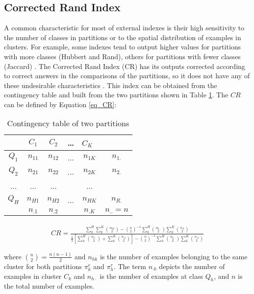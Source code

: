 \subsection{Corrected Rand Index}

A common characteristic for most of external indexes is their high sensitivity to the number of classes in partitions or to the spatial distribution of examples in clusters. For example, some indexes tend to output higher values for partitions with more classes (Hubbert and Rand), others for partitions with fewer classes (Jaccard) \cite{Dubes1987}. The Corrected Rand Index (CR) has its outputs corrected according to correct answers in the comparisons of the partitions, so it does not have any of these undesirable characteristics \cite{Milligan1986}. This index can be obtained from the contingency table and built from the two partitions shown in Table \ref{tab_contigencia}. The $CR$ can be defined by Equation \ref{eq_CR}:

\begin{table}[h]
\begin{center}
\caption{Contingency table of two partitions}
\label{tab_contigencia}
\begin{tabular}{|c|c|c|c|c|c|}
\hline &  $C_1$ & $C_2$ & \ldots & $C_K$\ & \\
\hline $Q_1$  & $n_{11}$ & $n_{12}$ & ...   & $n_{1K}$ & $n_{1.}$ \\
  $Q_2$  & $n_{21}$ & $n_{22}$ & ...   & $n_{2K}$ & $n_{2.}$ \\
 ... & ... & ... &   & ... & \\
 $Q_H$  & $n_{H1}$ & $n_{H2}$ & ...  & $n_{HK}$ & $n_{R.}$ \\
\hline  & $n_{.1}$ & $n_{.2}$ &       & $n_{.K}$ & $n_{..}=n$ \\
\hline
\end{tabular}
\end{center}
\end{table}

\begin{eqnarray}\label{eq_CR}
CR=
\frac{\sum_h^H \sum_k^K \binom{n_{hk}}{2}-\binom{n}{2}^{-1} \sum_h^H \binom{n_{h\cdot}}{2} \sum_k^K \binom{n_{\cdot k}}{2}}
{\frac{1}{2} \left[\sum_h^H \binom{n_{h\cdot}}{2} + \sum_k^K \binom{n_{\cdot k}}{2}\right] - \binom{n}{2}^{-1} \sum_h^H \binom{n_{h\cdot}}{2} \sum_k^K \binom{n_{\cdot k}}{2}}
\end{eqnarray}

\noindent
where $\binom{n}{2}=\frac{n(n-1)}{2}$ and $n_{hk}$ is the number of examples belonging to the same cluster for both partitions $\pi^e_k$ and $\pi^r_h$. The term $n_{\cdot k}$ depicts the number of examples in cluster $C_k$ and $n_{h\cdot}$ is the number of examples at class $Q_h$, and $n$ is the total number of examples.

